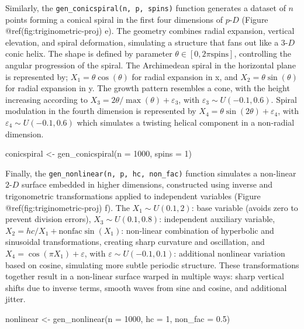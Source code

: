 \documentclass[
  11pt,
  a4paper,
]{report}
\newenvironment{Shaded}{\begin{snugshade}}{\end{snugshade}}
\newcommand{\AttributeTok}[1]{\textcolor[rgb]{0.40,0.45,0.13}{#1}}
\newcommand{\DecValTok}[1]{\textcolor[rgb]{0.68,0.00,0.00}{#1}}
\newcommand{\FloatTok}[1]{\textcolor[rgb]{0.68,0.00,0.00}{#1}}
\newcommand{\FunctionTok}[1]{\textcolor[rgb]{0.28,0.35,0.67}{#1}}
\newcommand{\NormalTok}[1]{\textcolor[rgb]{0.00,0.23,0.31}{#1}}
\newcommand{\OtherTok}[1]{\textcolor[rgb]{0.00,0.23,0.31}{#1}}
\begin{document}
Similarly, the \texttt{gen\_conicspiral(n,\ p,\ spins)} function
generates a dataset of \(n\) points forming a conical spiral in the
first four dimensions of \(p\text{-}D\) (Figure
@ref(fig:triginometric-proj) e). The geometry combines radial expansion,
vertical elevation, and spiral deformation, simulating a structure that
fans out like a \(3\text{-}D\) conic helix. The shape is defined by
parameter \(\theta \in [0, 2\pi\text{spins}]\), controlling the angular
progression of the spiral. The Archimedean spiral in the horizontal
plane is represented by; \(X_1 = \theta\cos(\theta)\) for radial
expansion in x, and \(X_2 = \theta\sin(\theta)\) for radial expansion in
y. The growth pattern resembles a cone, with the height increasing
according to \(X_3 = 2\theta / \max(\theta) + \varepsilon_3\), with
\(\varepsilon_3 \sim U(-0.1, 0.6).\) Spiral modulation in the fourth
dimension is represented by
\(X_4 = \theta\sin(2\theta) + \varepsilon_4\), with
\(\varepsilon_4 \sim U(-0.1, 0.6)\) which simulates a twisting helical
component in a non-radial dimension.

\begin{Shaded}
\begin{Highlighting}[]
\NormalTok{conicspiral }\OtherTok{\textless{}{-}} \FunctionTok{gen\_conicspiral}\NormalTok{(}\AttributeTok{n =} \DecValTok{1000}\NormalTok{, }\AttributeTok{spins =} \DecValTok{1}\NormalTok{)}
\end{Highlighting}
\end{Shaded}

Finally, the \texttt{gen\_nonlinear(n,\ p,\ hc,\ non\_fac)} function
simulates a non-linear \(2\text{-}D\) surface embedded in higher
dimensions, constructed using inverse and trigonometric transformations
applied to independent variables (Figure @ref(fig:triginometric-proj)
f). The \(X_{1} \sim U(0.1, 2)\): base variable (avoids zero to prevent
division errors), \(X_{3} \sim U(0.1, 0.8)\): independent auxiliary
variable, \(X_{2} = hc/X_{1} + \text{nonfac}\sin(X_{1})\): non-linear
combination of hyperbolic and sinusoidal transformations, creating sharp
curvature and oscillation, and
\(X_{4} = \cos(\pi X_{1}) + \varepsilon\), with
\(\varepsilon \sim U(-0.1, 0.1)\): additional nonlinear variation based
on cosine, simulating more subtle periodic structure. These
transformations together result in a non-linear surface warped in
multiple ways: sharp vertical shifts due to inverse terms, smooth waves
from sine and cosine, and additional jitter.

\begin{Shaded}
\begin{Highlighting}[]
\NormalTok{nonlinear }\OtherTok{\textless{}{-}} \FunctionTok{gen\_nonlinear}\NormalTok{(}\AttributeTok{n =} \DecValTok{1000}\NormalTok{, }\AttributeTok{hc =} \DecValTok{1}\NormalTok{, }\AttributeTok{non\_fac =} \FloatTok{0.5}\NormalTok{)}
\end{Highlighting}
\end{Shaded}
\end{document}
